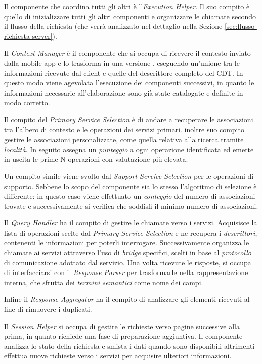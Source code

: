 Il componente che coordina tutti gli altri è l'\emph{Execution Helper}. Il suo compito è quello di inizializzare tutti gli altri componenti e organizzare le chiamate secondo il flusso della richiesta (che verrà analizzato nel dettaglio nella Sezione \ref{sec:flusso-richiesta-server}).

Il \emph{Context Manager} è il componente che si occupa di ricevere il contesto inviato dalla mobile app e lo trasforma in una versione , eseguendo un'unione tra le informazioni ricevute dal client e quelle del descrittore completo del CDT. In questo modo viene agevolata l'esecuzione dei componenti successivi, in quanto le informazioni necessarie all'elaborazione sono già state catalogate e definite in modo corretto.

Il compito del \emph{Primary Service Selection} è di andare a recuperare le associazioni tra l'albero di contesto e le operazioni dei servizi primari. \upe inoltre suo compito gestire le associazioni personalizzate, come quella relativa alla ricerca tramite \emph{località}. In seguito assegna un \emph{punteggio} a ogni operazione identificata ed emette in uscita le prime N operazioni con valutazione più elevata.

Un compito simile viene svolto dal \emph{Support Service Selection} per le operazioni di supporto. Sebbene lo scopo del componente sia lo stesso l'algoritmo di selezione è differente: in questo caso viene effettuato un \emph{conteggio} del numero di associazioni trovate e successivamente si verifica che soddisfi il minimo numero di associazioni.

Il \emph{Query Handler} ha il compito di gestire le chiamate verso i servizi. Acquisisce la lista di operazioni scelte dal \emph{Primary Service Selection} e ne recupera i \emph{descrittori}, contenenti le informazioni per poterli interrogare. Successivamente organizza le chiamate ai servizi attraverso l'uso di \emph{bridge} specifici, scelti in base al \emph{protocollo} di comunicazione adottato dal servizio. Una volta ricevute le risposte, si occupa di interfacciarsi con il \emph{Response Parser} per trasformarle nella rappresentazione interna, che sfrutta dei \emph{termini semantici} come nome dei campi.

Infine il \emph{Response Aggregator} ha il compito di analizzare gli elementi ricevuti al fine di rimuovere i duplicati.

Il \emph{Session Helper} si occupa di gestire le richieste verso pagine successive alla prima, in quanto richiede una fase di preparazione aggiuntiva. Il componente analizza lo stato della richiesta e smista i dati quando sono disponibili altrimenti effettua nuove richieste verso i servizi per acquisire ulteriori informazioni.

